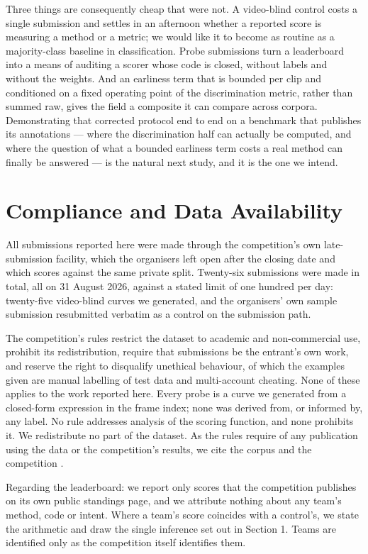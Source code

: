 Three things are consequently cheap that were not. A video-blind control costs a single submission and settles in an afternoon whether a reported score is measuring a method or a metric; we would like it to become as routine as a majority-class baseline in classification. Probe submissions turn a leaderboard into a means of auditing a scorer whose code is closed, without labels and without the weights. And an earliness term that is bounded per clip and conditioned on a fixed operating point of the discrimination metric, rather than summed raw, gives the field a composite it can compare across corpora. Demonstrating that corrected protocol end to end on a benchmark that publishes its annotations --- where the discrimination half can actually be computed, and where the question of what a bounded earliness term costs a real method can finally be answered --- is the natural next study, and it is the one we intend.


\section*{Compliance and Data Availability}

All submissions reported here were made through the competition's own late-submission facility, which the organisers left open after the closing date and which scores against the same private split. Twenty-six submissions were made in total, all on 31 August 2026, against a stated limit of one hundred per day: twenty-five video-blind curves we generated, and the organisers' own sample submission resubmitted verbatim as a control on the submission path.

The competition's rules restrict the dataset to academic and non-commercial use, prohibit its redistribution, require that submissions be the entrant's own work, and reserve the right to disqualify unethical behaviour, of which the examples given are manual labelling of test data and multi-account cheating. None of these applies to the work reported here. Every probe is a curve we generated from a closed-form expression in the frame index; none was derived from, or informed by, any label. No rule addresses analysis of the scoring function, and none prohibits it. We redistribute no part of the dataset. As the rules require of any publication using the data or the competition's results, we cite the corpus \citep{fang2024mmau} and the competition \citep{autopilot2026}.

Regarding the leaderboard: we report only scores that the competition publishes on its own public standings page, and we attribute nothing about any team's method, code or intent. Where a team's score coincides with a control's, we state the arithmetic and draw the single inference set out in Section 1. Teams are identified only as the competition itself identifies them.

